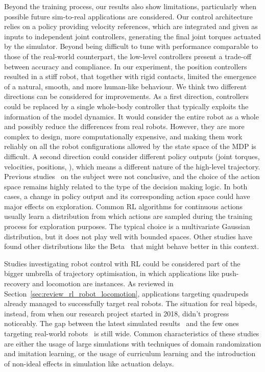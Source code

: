 Beyond the training process, our results also show limitations, particularly when possible future sim-to-real applications are considered.
Our control architecture relies on a policy providing velocity references, which are integrated and given as inputs to independent \pid joint controllers, generating the final joint torques actuated by the simulator.
Beyond being difficult to tune with performance comparable to those of the real-world counterpart, the low-level \pid controllers present a trade-off between accuracy and compliance.
In our experiment, the position \pid controllers resulted in a stiff robot, that together with rigid contacts, limited the emergence of a natural, smooth, and more human-like behaviour.
We think two different directions can be considered for improvements.
As a first direction, \pid controllers could be replaced by a single whole-body controller that typically exploits the information of the model dynamics.
It would consider the entire robot as a whole and possibly reduce the differences from real robots.
However, they are more complex to design, more computationally expensive, and making them work reliably on all the robot configurations allowed by the state space of the \ac{MDP} is difficult.
A second direction could consider different policy outputs (joint torques, velocities, positions, \etc), which means a different nature of the high-level trajectory.
Previous studies~\parencite{peng_learning_2017,reda_learning_2020} on the subject were not conclusive, and the choice of the action space remains highly related to the type of the decision making logic.
In both cases, a change in policy output and its corresponding action space could have major effects on exploration.
Common \ac{RL} algorithms for continuous actions usually learn a distribution from which actions are sampled during the training process for exploration purposes.
The typical choice is a multivariate Gaussian distribution, but it does not play well with bounded spaces.
Other studies have found other distributions like the Beta~\parencite{chou_improving_2017} that might behave better in this context.

Studies investigating robot control with \ac{RL} could be considered part of the bigger umbrella of trajectory optimisation, in which applications like push-recovery and locomotion are instances.
As reviewed in Section~\ref{sec:review_rl_robot_locomotion}, applications targeting quadrupeds already managed to successfully target real robots.
The situation for real bipeds, instead, from when our research project started in 2018, didn't progress noticeably.
The gap between the latest simulated results~\parencite{peng_ase_2022} and the few ones targeting real-world robots~\parencite{castillo_robust_2021,li_reinforcement_2021,rodriguez_deepwalk_2021,bloesch_towards_2022} is still wide.
Common characteristics of these studies are either the usage of large simulations with techniques of domain randomization and imitation learning, or the usage of curriculum learning and the introduction of non-ideal effects in simulation like actuation delays.

